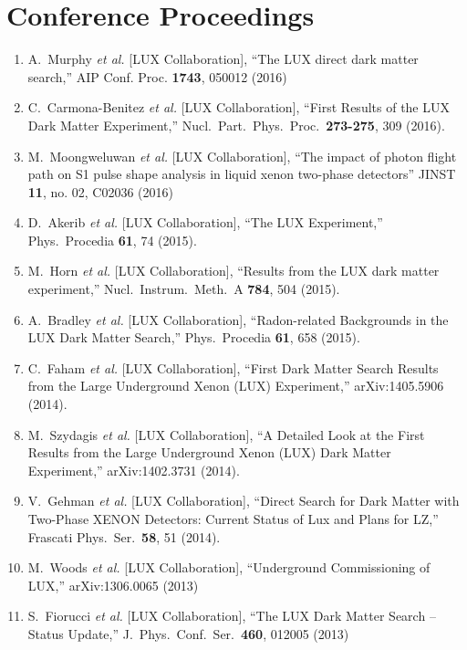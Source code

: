 \documentclass[a4paper,10pt]{article}
\begin{document}
\section{Conference Proceedings}
\begin{enumerate}

\item A.~Murphy {\it et al.} [LUX Collaboration], ``The LUX direct dark matter search,'' AIP Conf. Proc. {\bf 1743}, 050012 (2016)

\item  C.~Carmona-Benitez {\it et al.} [LUX Collaboration], ``First Results of the LUX Dark Matter Experiment,''
  Nucl.\ Part.\ Phys.\ Proc.\  {\bf 273-275}, 309 (2016).

\item  M.~Moongweluwan {\it et al.} [LUX Collaboration], ``The impact of photon flight path on S1 pulse shape analysis in liquid xenon two-phase detectors'' JINST {\bf 11}, no. 02, C02036 (2016)
    
\item  D.~Akerib {\it et al.} [LUX Collaboration], ``The LUX Experiment,'' Phys.\ Procedia {\bf 61}, 74 (2015).
  
\item M.~Horn {\it et al.} [LUX Collaboration], ``Results from the LUX dark matter experiment,'' Nucl.\ Instrum.\ Meth.\ A {\bf 784}, 504 (2015).

  \item   A.~Bradley {\it et al.}  [LUX Collaboration], ``Radon-related Backgrounds in the LUX Dark Matter Search,'' Phys.\ Procedia {\bf 61}, 658 (2015).
   
  \item C.~Faham {\it et al.}  [LUX Collaboration], ``First Dark Matter Search Results from the Large Underground Xenon (LUX) Experiment,''
  arXiv:1405.5906 (2014).
  
  \item   M.~Szydagis {\it et al.} [LUX Collaboration], ``A Detailed Look at the First Results from the Large Underground Xenon (LUX) Dark Matter Experiment,''  arXiv:1402.3731 (2014).

   \item V.~Gehman {\it et al.} [LUX Collaboration], ``Direct Search for Dark Matter with Two-Phase XENON Detectors: Current Status of Lux and Plans for LZ,'' Frascati Phys.\ Ser.\  {\bf 58}, 51 (2014).


 \item M.~Woods {\it et al.} [LUX Collaboration], ``Underground Commissioning of LUX,'' arXiv:1306.0065 (2013)

 \item S.~Fiorucci {\it et al.} [LUX Collaboration], ``The LUX Dark Matter Search – Status Update,'' J.\ Phys.\ Conf.\ Ser.\  {\bf 460}, 012005 (2013)

 \end{enumerate}
  
\end{document}
